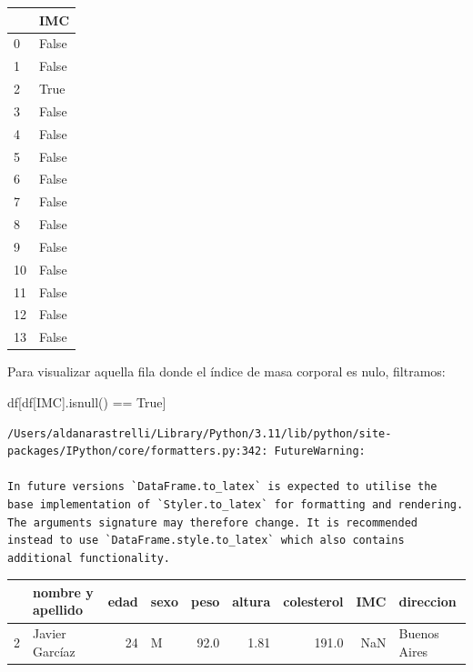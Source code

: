 \documentclass[
  letterpaper,
  DIV=11,
  numbers=noendperiod]{scrreprt}
\newenvironment{Shaded}{\begin{snugshade}}{\end{snugshade}}
\newcommand{\NormalTok}[1]{\textcolor[rgb]{0.00,0.23,0.31}{#1}}
\newcommand{\OperatorTok}[1]{\textcolor[rgb]{0.37,0.37,0.37}{#1}}
\newcommand{\StringTok}[1]{\textcolor[rgb]{0.13,0.47,0.30}{#1}}
\newcommand{\VariableTok}[1]{\textcolor[rgb]{0.07,0.07,0.07}{#1}}
\begin{document}
\begin{tabular}{ll}
\toprule
{} &    IMC \\
\midrule
0  &  False \\
1  &  False \\
2  &   True \\
3  &  False \\
4  &  False \\
5  &  False \\
6  &  False \\
7  &  False \\
8  &  False \\
9  &  False \\
10 &  False \\
11 &  False \\
12 &  False \\
13 &  False \\
\bottomrule
\end{tabular}

Para visualizar aquella fila donde el índice de masa corporal es nulo,
filtramos:

\begin{Shaded}
\begin{Highlighting}[]
\NormalTok{df[df[}\StringTok{\textquotesingle{}IMC\textquotesingle{}}\NormalTok{].isnull() }\OperatorTok{==} \VariableTok{True}\NormalTok{]}
\end{Highlighting}
\end{Shaded}

\begin{verbatim}
/Users/aldanarastrelli/Library/Python/3.11/lib/python/site-packages/IPython/core/formatters.py:342: FutureWarning:

In future versions `DataFrame.to_latex` is expected to utilise the base implementation of `Styler.to_latex` for formatting and rendering. The arguments signature may therefore change. It is recommended instead to use `DataFrame.style.to_latex` which also contains additional functionality.
\end{verbatim}

\begin{tabular}{llrlrrrrl}
\toprule
{} & nombre y apellido &  edad & sexo &  peso &  altura &  colesterol &  IMC &     direccion \\
\midrule
2 &    Javier Garcíaz &    24 &    M &  92.0 &    1.81 &       191.0 &  NaN &  Buenos Aires \\
\bottomrule
\end{tabular}
\end{document}

